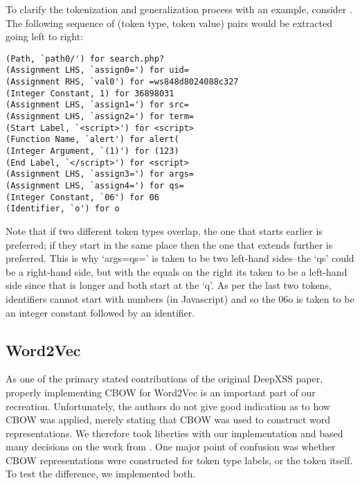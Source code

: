 To clarify the tokenization and generalization process with an example, consider . The following sequence of (token type, token value) pairs would be extracted going left to right:


\begin{lstlisting}[caption=Example tokenization, label=tokenization]
(Path, `path0/') for search.php?
(Assignment LHS, `assign0=') for uid=
(Assignment RHS, `val0') for =ws848d8024088c327
(Integer Constant, 1) for 36898031
(Assignment LHS, `assign1=') for src=
(Assignment LHS, `assign2=') for term=
(Start Label, `<script>') for <script>
(Function Name, `alert') for alert(
(Integer Argument, `(1)') for (123)
(End Label, `</script>') for <script>
(Assignment LHS, `assign3=') for args=
(Assignment LHS, `assign4=') for qs=
(Integer Constant, `06') for 06
(Identifier, `o') for o
\end{lstlisting}


Note that if two different token types overlap, the one that starts earlier is preferred; if they start in the same place then the one that extends further is preferred. This is why `args=qs=' is taken to be two left-hand sides--the `qs' could be a right-hand side, but with the equals on the right its taken to be a left-hand side since that is longer and both start at the `q'. As per the last two tokens, identifiers cannot start with numbers  (in Javascript) and so the 06o is taken to be an integer constant followed by an identifier.


\subsection{Word2Vec}

As one of the primary stated contributions of the original DeepXSS \cite{fang2018deepxss} paper, properly implementing CBOW for Word2Vec is an important part of our recreation. Unfortunately, the authors do not give good indication as to how CBOW was applied, merely stating that CBOW was used to construct word representations. We therefore took liberties with our implementation and based many decisions on the work from \cite{afzal2021deeplearning}. One major point of confusion was whether CBOW representations were constructed for token type labels, or the token itself. To test the difference, we implemented both.

